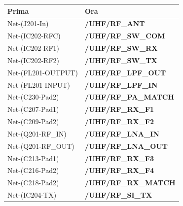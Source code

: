 {\small{}\setlength{\tabcolsep}{4pt}\renewcommand{\arraystretch}{1.1}
\begin{longtable}{>{\raggedright\arraybackslash}p{}>{\raggedright\arraybackslash}p{}}
\toprule
\textbf{Prima} & \textbf{Ora} \\
\midrule
\endhead
\bottomrule\endfoot
Net-(J201-In) & \textbf{/\allowbreak{}UHF/\allowbreak{}RF\_\allowbreak{}ANT} \\\midrule[0.15pt]
Net-(IC202-RFC) & \textbf{/\allowbreak{}UHF/\allowbreak{}RF\_\allowbreak{}SW\_\allowbreak{}COM} \\\midrule[0.15pt]
Net-(IC202-RF1) & \textbf{/\allowbreak{}UHF/\allowbreak{}RF\_\allowbreak{}SW\_\allowbreak{}RX} \\\midrule[0.15pt]
Net-(IC202-RF2) & \textbf{/\allowbreak{}UHF/\allowbreak{}RF\_\allowbreak{}SW\_\allowbreak{}TX} \\\midrule[0.15pt]
Net-(FL201-OUTPUT) & \textbf{/\allowbreak{}UHF/\allowbreak{}RF\_\allowbreak{}LPF\_\allowbreak{}OUT} \\\midrule[0.15pt]
Net-(FL201-INPUT) & \textbf{/\allowbreak{}UHF/\allowbreak{}RF\_\allowbreak{}LPF\_\allowbreak{}IN} \\\midrule[0.15pt]
Net-(C230-Pad2) & \textbf{/\allowbreak{}UHF/\allowbreak{}RF\_\allowbreak{}PA\_\allowbreak{}MATCH} \\\midrule[0.15pt]
Net-(C207-Pad1) & \textbf{/\allowbreak{}UHF/\allowbreak{}RF\_\allowbreak{}RX\_\allowbreak{}F1} \\\midrule[0.15pt]
Net-(C209-Pad2) & \textbf{/\allowbreak{}UHF/\allowbreak{}RF\_\allowbreak{}RX\_\allowbreak{}F2} \\\midrule[0.15pt]
Net-(Q201-RF\_\allowbreak{}IN) & \textbf{/\allowbreak{}UHF/\allowbreak{}RF\_\allowbreak{}LNA\_\allowbreak{}IN} \\\midrule[0.15pt]
Net-(Q201-RF\_\allowbreak{}OUT) & \textbf{/\allowbreak{}UHF/\allowbreak{}RF\_\allowbreak{}LNA\_\allowbreak{}OUT} \\\midrule[0.15pt]
Net-(C213-Pad1) & \textbf{/\allowbreak{}UHF/\allowbreak{}RF\_\allowbreak{}RX\_\allowbreak{}F3} \\\midrule[0.15pt]
Net-(C216-Pad2) & \textbf{/\allowbreak{}UHF/\allowbreak{}RF\_\allowbreak{}RX\_\allowbreak{}F4} \\\midrule[0.15pt]
Net-(C218-Pad2) & \textbf{/\allowbreak{}UHF/\allowbreak{}RF\_\allowbreak{}RX\_\allowbreak{}MATCH} \\\midrule[0.15pt]
Net-(IC204-TX) & \textbf{/\allowbreak{}UHF/\allowbreak{}RF\_\allowbreak{}SI\_\allowbreak{}TX} \\\midrule[0.15pt]

\end{longtable}}
